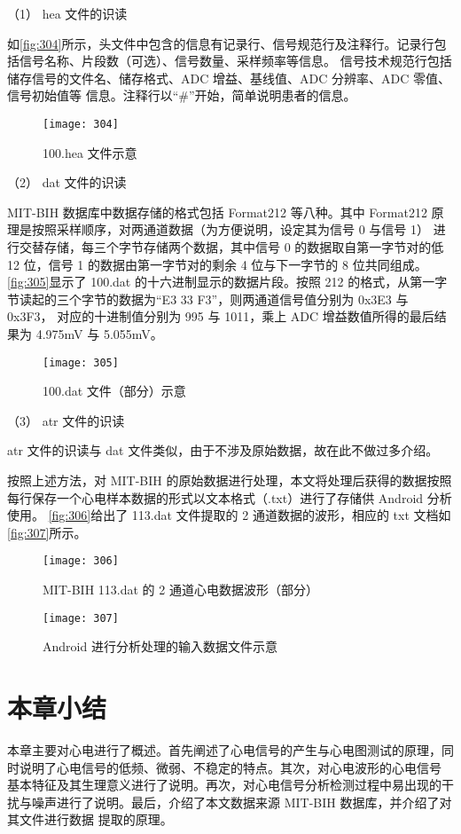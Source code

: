 （1）	hea 文件的识读 

如\autoref{fig:304}所示，头文件中包含的信息有记录行、信号规范行及注释行。记录行包括信号名称、片段数（可选）、信号数量、采样频率等信息。
信号技术规范行包括储存信号的文件名、储存格式、ADC 增益、基线值、ADC 分辨率、ADC 零值、信号初始值等
信息。注释行以“\#”开始，简单说明患者的信息。 
\begin{figure}[htbp]
    \centering
    \texttt{[image: 304]}
    \caption{\label{fig:304}100.hea 文件示意}
\end{figure}

（2）	dat 文件的识读 

MIT-BIH 数据库中数据存储的格式包括 Format212 等八种。其中 Format212 原理是按照采样顺序，对两通道数据（为方便说明，设定其为信号 0 与信号 1）
进行交替存储，每三个字节存储两个数据，其中信号 0 的数据取自第一字节对的低 12 位，信号 1 的数据由第一字节对的剩余 4 位与下一字节的 8 位共同组成。
\autoref{fig:305}显示了 100.dat 的十六进制显示的数据片段。按照 212 的格式，从第一字节读起的三个字节的数据为“E3 33 F3”，则两通道信号值分别为 0x3E3 与 0x3F3，
对应的十进制值分别为 995 与 1011，乘上 ADC 增益数值所得的最后结果为 4.975mV 与 5.055mV。 
\begin{figure}[htbp]
    \centering
    \texttt{[image: 305]}
    \caption{\label{fig:305}100.dat 文件（部分）示意 }
\end{figure}

（3）	atr 文件的识读 

atr 文件的识读与 dat 文件类似，由于不涉及原始数据，故在此不做过多介绍。 

按照上述方法，对 MIT-BIH 的原始数据进行处理，本文将处理后获得的数据按照每行保存一个心电样本数据的形式以文本格式（.txt）进行了存储供 Android 分析使用。
\autoref{fig:306}给出了 113.dat 文件提取的 2 通道数据的波形，相应的 txt 文档如\autoref{fig:307}所示。 

\begin{figure}[htbp]
    \centering
    \texttt{[image: 306]}
    \caption{\label{fig:306}MIT-BIH 113.dat 的 2 通道心电数据波形（部分）}
\end{figure}

\begin{figure}[htbp]
    \centering
    \texttt{[image: 307]}
    \caption{\label{fig:307}Android 进行分析处理的输入数据文件示意}
\end{figure}

\section{本章小结}
本章主要对心电进行了概述。首先阐述了心电信号的产生与心电图测试的原理，同时说明了心电信号的低频、微弱、不稳定的特点。其次，对心电波形的心电信号
基本特征及其生理意义进行了说明。再次，对心电信号分析检测过程中易出现的干扰与噪声进行了说明。最后，介绍了本文数据来源 MIT-BIH 数据库，并介绍了对其文件进行数据
提取的原理。 
